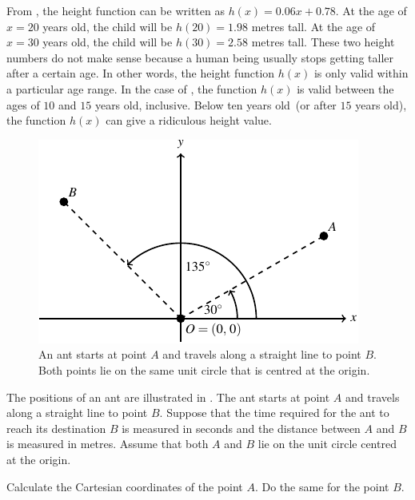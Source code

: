 \documentclass[a4paper,oneside,12pt]{article}
\begin{document}
\begin{problem}
{\begin{solution}
From ,
the height function can be written as $h(x) = 0.06x + 0.78$.  At the
age of $x = 20$ years old, the child will be $h(20) = 1.98$ metres
tall.  At the age of $x = 30$ years old, the child will be
$h(30) = 2.58$ metres tall.  These two height numbers do not make
sense because a human being usually stops getting taller after a
certain age.  In other words, the height function $h(x)$ is only valid
within a particular age range.  In the case of
, the function $h(x)$ is valid
between the ages of $10$ and $15$ years old, inclusive.  Below ten
years old~(or after $15$ years old), the function $h(x)$ can give a
ridiculous height value.
\end{solution}
}{}

\begin{figure}[!htbp]
\centering
\includegraphics[scale=1.5]{image/06/points-unit-circle.pdf}
\caption{%
  An ant starts at point $A$ and travels along a straight line to
  point $B$.  Both points lie on the same unit circle that is centred
  at the origin.
}
\label{fig:unit_circle_A_30_degrees_B_135_degrees}
\end{figure}

\item The positions of an ant are illustrated in
  .  The ant starts
  at point $A$ and travels along a straight line to point $B$.
  Suppose that the time required for the ant to reach its destination
  $B$ is measured in seconds and the distance between $A$ and $B$ is
  measured in metres.  Assume that both $A$ and $B$ lie on the unit
  circle centred at the origin.
  \begin{packedenum}
  \item\label{subprob:ant_coordinates_of_points}
    Calculate the Cartesian coordinates of the point $A$.  Do the same
    for the point $B$.


\end{packedenum}
\end{problem}
\end{document}
